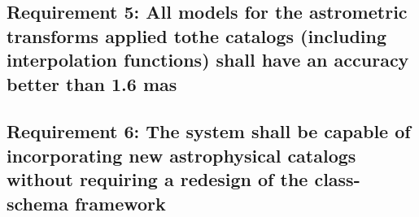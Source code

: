 \documentclass[]{article}
\begin{document}
\subsection{Requirement 5: All models for the astrometric transforms applied tothe catalogs (including interpolation functions) 
shall have an accuracy better than 1.6 mas}
\subsection{Requirement 6: The system shall be capable of incorporating new astrophysical catalogs without requiring
a redesign of the class-schema framework}
\end{document}
